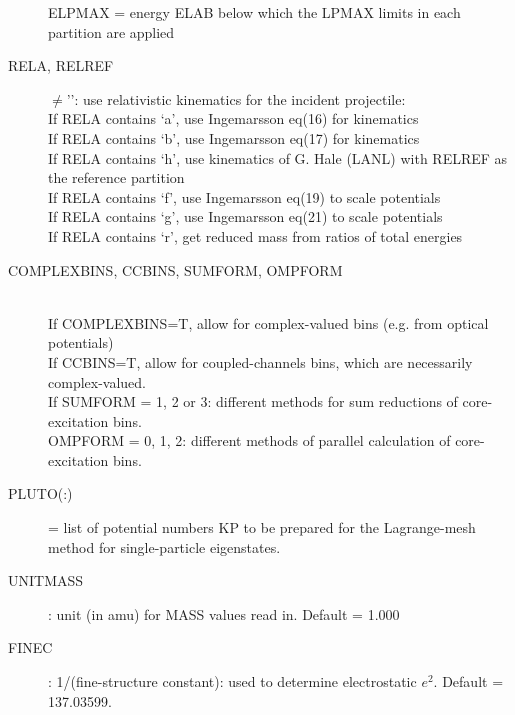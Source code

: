 \documentclass[11pt]{article}
\newcommand{\upq}{\textsf{'}}
\begin{document}
\begin{description}
ELPMAX = energy ELAB below which the LPMAX limits in each partition are applied 

\item[RELA, RELREF]
$\neq$\upq \upq: use relativistic kinematics for the incident projectile:\\
If RELA contains `a', use Ingemarsson eq(16) for kinematics\\
If RELA contains `b', use Ingemarsson eq(17) for kinematics\\
If RELA contains `h', use kinematics of G. Hale (LANL) with RELREF as the reference partition\\
If RELA contains `f', use Ingemarsson eq(19) to scale potentials\\
If RELA contains `g', use Ingemarsson eq(21) to scale potentials\\
If RELA contains `r', get reduced mass from ratios of total energies

\item[COMPLEXBINS, CCBINS, SUMFORM, OMPFORM]  ~\\
If COMPLEXBINS=T, allow for complex-valued bins (e.g. from optical potentials)\\
If CCBINS=T, allow for coupled-channels bins, which are necessarily complex-valued.\\
If SUMFORM = 1, 2 or 3: different methods for sum reductions of core-excitation bins. \\
OMPFORM  = 0, 1, 2: different methods of parallel calculation of core-excitation bins.


\item[PLUTO(:)]
 =  list of potential numbers KP to be prepared for the Lagrange-mesh method for single-particle eigenstates. 

\item[UNITMASS] : unit (in amu) for MASS values read in.
Default = 1.000

\item[FINEC]: 1/(fine-structure constant): used to determine electrostatic $e^2$.
Default = 137.03599.

\end{description}
\end{document}
